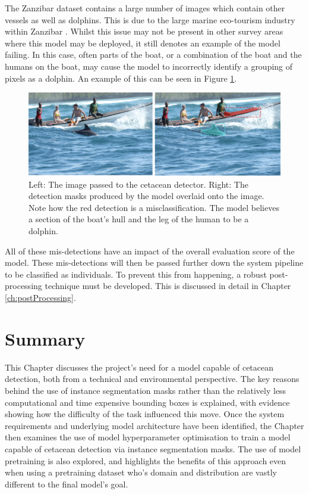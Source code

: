 The Zanzibar dataset contains a large number of images which contain other vessels as well as dolphins. This is due to the large marine eco-tourism industry within Zanzibar \cite{sharpe_indian_2019-1, berggren_sustainable_2007}. Whilst this issue may not be present in other survey areas where this model may be deployed, it still denotes an example of the model failing. In this case, often parts of the boat, or a combination of the boat and the humans on the boat, may cause the model to incorrectly identify a grouping of pixels as a dolphin. An example of this can be seen in Figure \ref{fig:model-fail-boat}.
 
\begin{figure}[h]
	\begin{center}
		\includegraphics[scale=0.4]{Chapter3/figs/model-fail-boat.png}
	\end{center}
	\caption{Left: The image passed to the cetacean detector. Right: The detection masks produced by the model overlaid onto the image. Note how the red detection is a misclassification. The model believes a section of the boat's hull and the leg of the human to be a dolphin.}
	\label{fig:model-fail-boat}
\end{figure}

All of these mis-detections have an impact of the overall evaluation score of the model. These mis-detections will then be passed further down the system pipeline to be classified as individuals. To prevent this from happening, a robust post-processing technique must be developed. This is discussed in detail in Chapter \ref{ch:postProcessing}.
 

\section{Summary}\label{ch:cetDet,sec:Summary}

This Chapter discusses the project's need for a model capable of cetacean detection, both from a technical and environmental perspective. The key reasons behind the use of instance segmentation masks rather than the relatively less computational and time expensive bounding boxes is explained, with evidence showing how the difficulty of the task influenced this move. Once the system requirements and underlying model architecture have been identified, the Chapter then examines the use of model hyperparameter optimisation to train a model capable of cetacean detection via instance segmentation masks. The use of model pretraining is also explored, and highlights the benefits of this approach even when using a pretraining dataset who's domain and distribution are vastly different to the final model's goal. 

